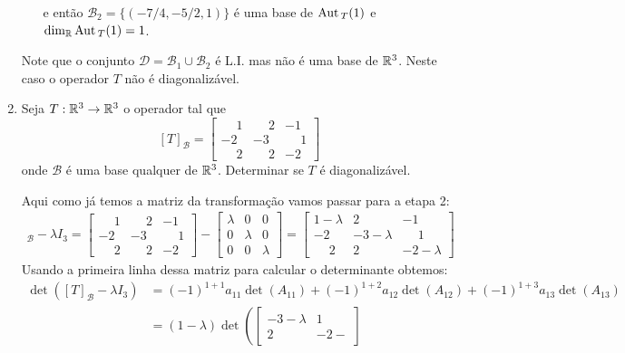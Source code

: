 \begin{exemplo}
\begin{enumerate}[label={\arabic*})]
\begin{solucao}
\begin{itemize}
\[                \]
                e então $\mathcal{B}_2 = \{(-7/4,-5/2,1)\}$ é uma base de ${\rm Aut\,}_T(1)$ e $\dim_{\mathbb{R}}{\rm Aut\,}_T(1) = 1$.
            \end{itemize}
            Note que o conjunto $\mathcal{D} = \mathcal{B}_1 \cup \mathcal{B}_2$ é L.I. mas não é uma base de $\mathbb{R}^3$. Neste caso o
            operador $T$ não é diagonalizável.
        \end{solucao}
        \item Seja $T : \mathbb{R}^3 \to \mathbb{R}^3$ o operador tal que
        \[
            [T]_\mathcal{B} = \begin{bmatrix}
                                \phantom{-}1 & \phantom{-}2 & -1\\
                                -2 & -3 & \phantom{-}1\\
                                \phantom{-}2 & \phantom{-}2 & -2
                            \end{bmatrix}
        \]
        onde $\mathcal{B}$ é uma base qualquer de $\mathbb{R}^3$. Determinar se $T$ é diagonalizável.
        \begin{solucao}
            Aqui como já temos a matriz da transformação vamos passar para a etapa 2:
            \begin{align*}
                [T]_\mathcal{B} - \lambda I_3 = \begin{bmatrix}\phantom{-}1 & \phantom{-}2 & -1\\-2 & -3 & \phantom{-}1\\\phantom{-}2 &
                    \phantom{-}2 & -2\end{bmatrix} - \begin{bmatrix} \lambda & 0 & 0\\0 & \lambda & 0\\0 & 0 & \lambda\end{bmatrix} =
                    \begin{bmatrix}1 - \lambda & 2 & -1\\-2 & -3 - \lambda & \phantom{-}1\\\phantom{-}2 & 2 &-2 - \lambda\end{bmatrix}
            \end{align*}
            Usando a primeira linha dessa matriz para calcular o determinante obtemos:
            \begin{align*}
                \det([T]_\mathcal{B} - \lambda I_3) &= (-1)^{1 + 1}a_{11}\det(A_{11}) + (-1)^{1 + 2}a_{12}\det(A_{12}) +
                (-1)^{1 + 3}a_{13}\det(A_{13}) \\ &= (1 - \lambda)\det\left(\begin{bmatrix}-3 - \lambda & 1\\2 & -2 -

\end{bmatrix}
\end{align*}
\end{solucao}
\end{enumerate}
\end{exemplo}
